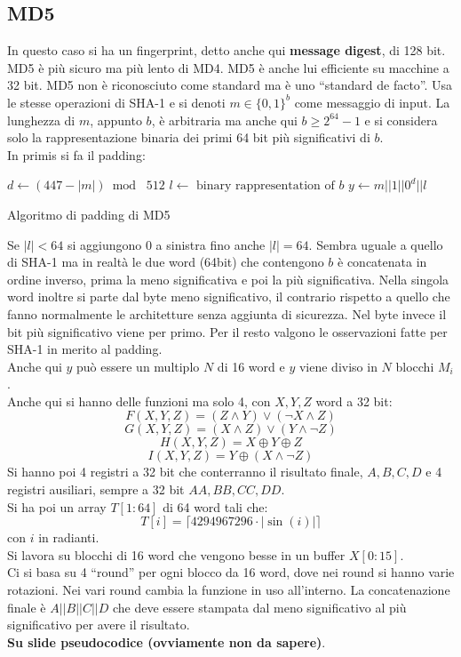 \documentclass[a4paper,12pt, oneside]{book}
\begin{document}
\subsection{MD5}
In questo caso si ha un fingerprint, detto anche qui \textbf{message digest}, di
128 bit. MD5 è più sicuro ma più lento di MD4. MD5 è anche lui efficiente su
macchine a 32 bit. MD5 non è riconosciuto come standard ma è uno ``standard de
facto''. Usa le stesse operazioni di SHA-1 e si denoti $m\in\{0,1\}^b$ come
messaggio di input. La lunghezza di $m$, appunto $b$, è arbitraria ma anche qui
$b\geq 2^{64}-1$ e si considera solo la rappresentazione binaria dei primi 64
bit più significativi di $b$.\\
In primis si fa il padding:
\begin{algorithm}[H]
  \begin{algorithmic}
    \State $d\gets (447-|m|)\bmod\,\,512$
    \State $l\gets\mbox{ binary rappresentation of }b$
    \State $y\gets m||1||0^d||l$
    \EndFunction
  \end{algorithmic}
  \caption{Algoritmo di padding di MD5}
\end{algorithm}
Se $|l|<64$ si aggiungono 0 a sinistra fino anche $|l|=64$. Sembra uguale a
quello di SHA-1 ma in realtà le due word (64bit) che contengono $b$ è
concatenata in ordine inverso, prima la meno significativa e poi la più
significativa. Nella singola word inoltre si parte dal byte meno significativo,
il contrario rispetto a quello che fanno normalmente le architetture senza
aggiunta di sicurezza. Nel byte invece il bit più significativo viene per
primo. Per il resto valgono le osservazioni fatte per SHA-1 in merito al
padding.\\
Anche qui $y$ può essere un multiplo $N$ di 16 word e $y$ viene diviso in $N$
blocchi $M_i$.\\
Anche qui si hanno delle funzioni ma solo 4, con $X,Y,Z$ word a 32 bit:
\[F(X,Y,Z)=(Z\land Y)\lor (\neg X\land Z)\]
\[G(X,Y,Z)=(X\land Z)\lor (Y\land\neg  Z)\]
\[H(X,Y,Z)=X\oplus Y\oplus Z\]
\[I(X,Y,Z)=Y\oplus (X\land\neg  Z)\]
Si hanno poi 4 registri a 32 bit che conterranno il risultato finale, $A,B,C,D$
e 4 registri ausiliari, sempre a 32 bit $AA,BB,CC,DD$.\\
Si ha poi un array $T[1:64]$ di 64 word tali che:
\[T[i]=\lceil 4294967296\cdot |\sin(i)|\rceil\]
con $i$ in radianti.\\
Si lavora su blocchi di 16 word che vengono besse in un buffer $X[0:15]$.\\
Ci si basa su 4 ``round'' per ogni blocco da 16 word, dove nei round si hanno
varie rotazioni. Nei vari round cambia la funzione in uso all'interno. La
concatenazione finale è $A||B||C||D$ che deve essere stampata dal meno
significativo al più significativo per avere il risultato.\\
\textbf{Su slide pseudocodice (ovviamente non da sapere)}.
\end{document}
